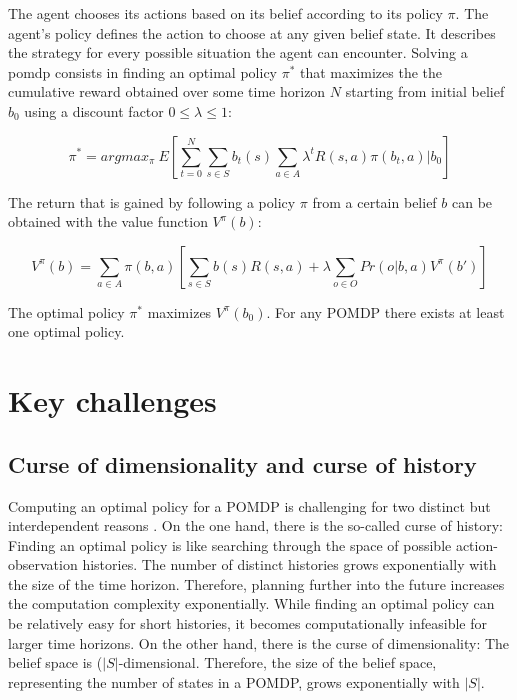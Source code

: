 The agent chooses its actions based on its belief according to its policy $\pi$. The agent's policy defines the action to choose at any given belief state. It describes the strategy for every possible situation the agent can encounter. Solving a \gls{pomdp} consists in finding an optimal policy $\pi^*$ that maximizes the the cumulative reward obtained over some time horizon $N$ starting from initial belief $b_0$ using a discount factor $0 \leq \lambda \leq 1$:

\begin{equation}
    \pi^* = argmax_{\pi}~E\left[ \sum_{t=0}^{N} \sum_{s \in S}b_t(s) \sum_{a \in A} \lambda^t R(s,a) \pi(b_t,a) | b_0\right]
\end{equation}

The return that is gained by following a policy $\pi$ from a certain belief $b$ can be obtained with the value function $V^\pi(b)$:

\begin{equation}
    V^\pi(b) = \sum_{a \in A} \pi(b,a) \left[ \sum_{s \in S} b(s) R(s,a) + \lambda \sum_{o \in O} Pr(o | b, a) V^\pi(b')\right]
\end{equation}

The optimal policy $\pi^*$ maximizes $V^\pi(b_0)$. For any POMDP there exists at least one optimal policy.

\section{Key challenges}
\label{sec:challenges}

\subsection{Curse of dimensionality and curse of history}
\label{sec:curses}

Computing an optimal policy for a POMDP is challenging for two distinct but interdependent reasons \parencite{pomdp_curses}. On the one hand, there is the so-called curse of history: Finding an optimal policy is like searching through the space of possible action-observation histories. The number of distinct histories grows exponentially with the size of the time horizon. Therefore, planning further into the future increases the computation complexity exponentially. While finding an optimal policy can be relatively easy for short histories, it becomes computationally infeasible for larger time horizons. On the other hand, there is the curse of dimensionality: The belief space is ($|S|$-dimensional. Therefore, the size of the belief space, representing the number of states in a POMDP, grows exponentially with $|S|$.

